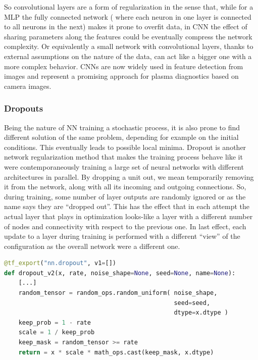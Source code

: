 So convolutional layers are a form of regularization in the sense that, while for a \ac{MLP} the fully connected network ( where each neuron in one layer is connected to all neurons in the next) makes it prone to overfit data, in \ac{CNN} the effect of sharing parameters along the features could be eventually compress the network complexity. Or equivalently a small network with convolutional layers, thanks to external assumptions on the nature of the data, can act like a bigger one with a more complex behavior. CNNs are now widely used in feature detection from images and represent a promising approach for plasma diagnostics based on camera images.%
%

\subsubsection{Dropouts}
Being the nature of NN training a stochastic process, it is also prone to find different solution of the same problem, depending for example on the initial conditions. This eventually leads to possible local minima. 
Dropout is another network regularization method that makes the training process behave like it were contemporaneously training a large set of neural networks with different architectures in parallel.
By dropping a unit out, we mean temporarily removing it from the network, along with all its incoming and outgoing connections.
So, during training, some number of layer outputs are randomly ignored or as the name says they are “dropped out”. This has the effect that in each attempt the actual layer that plays in optimization looks-like a layer with a different number of nodes and connectivity with respect to the previous one. In last effect, each update to a layer during training is performed with a different “view” of the configuration as the overall network were a different one.

\begin{lstlisting}[language=Python, caption=Dropout layer code example (from Tensorflow 2.0)]
@tf_export("nn.dropout", v1=[])
def dropout_v2(x, rate, noise_shape=None, seed=None, name=None):
    [...]
    random_tensor = random_ops.random_uniform( noise_shape, 
                                               seed=seed, 
                                               dtype=x.dtype )
    keep_prob = 1 - rate
    scale = 1 / keep_prob
    keep_mask = random_tensor >= rate
    return = x * scale * math_ops.cast(keep_mask, x.dtype)
\end{lstlisting}

